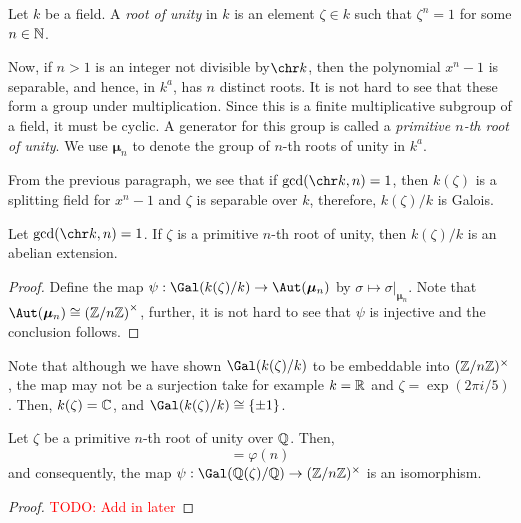 \begin{definition}
    Let $k$ be a field. A \textit{root of unity} in $k$ is an element $\zeta\in k$ such that $\zeta^n = 1$ for some $n\in\mathbb{N}$.
\end{definition}

Now, if $n > 1$ is an integer not divisible by$ \chr k$, then the polynomial $x^n - 1$ is separable, and hence, in $k^a$, has $n$ distinct roots. It is not hard to see that these form a group under multiplication. Since this is a finite multiplicative subgroup of a field, it must be cyclic. A generator for this group is called a \textit{primitive $n$-th root of unity}. We use $\bm{\mu}_n$ to denote the group of $n$-th roots of unity in $k^a$.

From the previous paragraph, we see that if $\gcd(\chr k, n) = 1$, then $k(\zeta)$ is a splitting field for $x^n - 1$ and $\zeta$ is separable over $k$, therefore, $k(\zeta)/k$ is Galois.

\begin{proposition}
    Let $\gcd(\chr k, n) = 1$. If $\zeta$ is a primitive $n$-th root of unity, then $k(\zeta)/k$ is an abelian extension.
\end{proposition}
\begin{proof}
    Define the map $\psi:\Gal(k(\zeta)/k)\to\Aut(\bm\mu_n)$ by $\sigma\mapsto\sigma|_{\bm\mu_n}$. Note that $\Aut(\bm\mu_n)\cong\left(\Z/n\Z\right)^\times$, further, it is not hard to see that $\psi$ is injective and the conclusion follows.
\end{proof}

Note that although we have shown $\Gal(k(\zeta)/k)$ to be embeddable into $(\mathbb{Z}/n\mathbb{Z})^\times$, the map may not be a surjection take for example $k = \mathbb{R}$ and $\zeta = \exp(2\pi i/5)$. Then, $k(\zeta) = \mathbb{C}$, and $\Gal(k(\zeta)/k)\cong\{\pm 1\}$.

\begin{proposition}
    Let $\zeta$ be a primitive $n$-th root of unity over $\mathbb{Q}$. Then, 
    \begin{equation*}
        [\Q(\zeta):\Q] = \varphi(n)
    \end{equation*}
    and consequently, the map $\psi:\Gal(\Q(\zeta)/\Q)\to(\Z/n\Z)^\times$ is an isomorphism.
\end{proposition}
\begin{proof}
    \textcolor{red}{TODO: Add in later}
\end{proof}